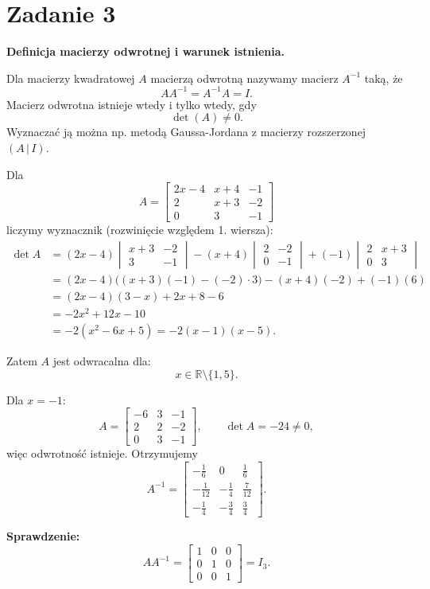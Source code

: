 \documentclass[12pt,a4paper]{article}
\begin{document}
\section*{Zadanie 3}
\textbf{Definicja macierzy odwrotnej i warunek istnienia.}

Dla macierzy kwadratowej $A$ macierzą odwrotną nazywamy macierz $A^{-1}$ taką, że
\[
AA^{-1}=A^{-1}A=I.
\]
Macierz odwrotna istnieje wtedy i tylko wtedy, gdy
\[
\det(A)\neq 0.
\]
Wyznaczać ją można np. metodą Gaussa-Jordana z macierzy rozszerzonej $(A\,|\,I)$.

Dla
\[
A=
\begin{bmatrix}
2x-4&x+4&-1\\
2&x+3&-2\\
0&3&-1
\end{bmatrix}
\]
liczymy wyznacznik (rozwinięcie względem 1. wiersza):
\begin{align*}
\det A&=(2x-4)
\begin{vmatrix}
x+3&-2\\3&-1
\end{vmatrix}
-(x+4)
\begin{vmatrix}
2&-2\\0&-1
\end{vmatrix}
+(-1)
\begin{vmatrix}
2&x+3\\0&3
\end{vmatrix}\\
&=(2x-4)\big((x+3)(-1)-(-2)\cdot3\big)
-(x+4)(-2)+(-1)(6)\\
&=(2x-4)(3-x)+2x+8-6\\
&=-2x^2+12x-10\\
&=-2(x^2-6x+5)=-2(x-1)(x-5).
\end{align*}

Zatem $A$ jest odwracalna dla:
\[
\boxed{x\in\mathbb R\setminus\{1,5\}.}
\]

Dla $x=-1$:
\[
A=
\begin{bmatrix}
-6&3&-1\\
2&2&-2\\
0&3&-1
\end{bmatrix},
\qquad
\det A=-24\neq 0,
\]
więc odwrotność istnieje. Otrzymujemy
\[
A^{-1}=
\begin{bmatrix}
-\frac16&0&\frac16\\
-\frac1{12}&-\frac14&\frac7{12}\\
-\frac14&-\frac34&\frac34
\end{bmatrix}.
\]

\textbf{Sprawdzenie:}
\[
AA^{-1}=
\begin{bmatrix}
1&0&0\\
0&1&0\\
0&0&1
\end{bmatrix}=I_3.
\]
\end{document}
